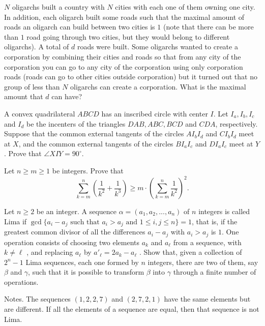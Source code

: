\documentclass[11pt]{scrartcl}
\begin{document}
\begin{problem}[4439711278400170990]
	$N$ oligarchs built a country with $N$ cities with each one of them owning one city. In addition, each oligarch built some roads such that the maximal amount of roads an oligarch can build between two cities is $1$ (note that there can be more than $1$ road going through two cities, but they would belong to different oligarchs).
A total of $d$ roads were built. Some oligarchs wanted to create a corporation by combining their cities and roads so that from any city of the corporation you can go to any city of the corporation using only corporation roads (roads can go to other cities outside corporation) but it turned out that no group of less than $N$ oligarchs can create a corporation. What is the maximal amount that $d$ can have?
\end{problem}
\begin{problem}[4451072691230235426]
A convex quadrilateral $ABCD$ has an inscribed circle with center $I$. Let $I_a, I_b, I_c$ and $I_d$ be the incenters of the triangles $DAB, ABC, BCD$ and $CDA$, respectively. Suppose that the common external tangents of the circles $AI_bI_d$ and $CI_bI_d$ meet at $X$, and the common external tangents of the circles $BI_aI_c$ and $DI_aI_c$ meet at $Y$. Prove that $\angle{XIY}=90^{\circ}$.
\end{problem}
\begin{problem}[4479133443678014025]
Let $n\ge m\ge 1$ be integers. Prove that
\[\sum_{k=m}^n \left (\frac 1{k^2}+\frac 1{k^3}\right) \ge m\cdot \left(\sum_{k=m}^n \frac 1{k^2}\right)^2.\]
\end{problem}
\begin{problem}[4514183051583887150]
Let $n\ge 2$ be an integer. A sequence $\alpha = (a_1, a_2,..., a_n)$ of $n$ integers is called Lima if $\gcd \{a_i - a_j \text{ such that } a_i> a_j \text{ and } 1\le i, j\le n\} = 1$, that is, if the greatest common divisor of all the differences $a_i - a_j$ with $a_i> a_j$ is $1$. One operation consists of choosing two elements $a_k$ and $a_{\ell}$ from a sequence, with $k\ne \ell $ , and replacing $a_{\ell}$ by $a'_{\ell}  = 2a_k - a_{\ell}$ .
Show that, given a collection of $2^n - 1$ Lima sequences, each one formed by $n$ integers, there are two of them, say $\beta$ and $\gamma$, such that it is possible to transform $\beta$ into $\gamma$ through a finite number of operations.

Notes.
The sequences $(1,2,2,7)$ and $(2,7,2,1)$ have the same elements but are different.
If all the elements of a sequence are equal, then that sequence is not Lima.
\end{problem}
\end{document}
